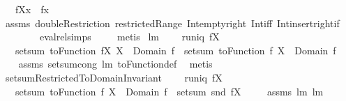 \begin{isabellebody}
\ \ \ {\isachardoublequoteopen}{\isacharparenleft}f{\isacharbar}{\isacharbar}X{\isacharparenright}{\isacharcomma}{\isacharcomma}x\ {\isacharequal}\ f{\isacharcomma}{\isacharcomma}x{\isachardoublequoteclose}\ \isanewline
%
\isadelimproof
\ \ %
\endisadelimproof
%
\isatagproof
{}\isamarkupfalse%
\ assms\ doubleRestriction\ restrictedRange\ Int{\isacharunderscore}empty{\isacharunderscore}right\ Int{\isacharunderscore}iff\ Int{\isacharunderscore}insert{\isacharunderscore}right{\isacharunderscore}if{}\isanewline
\ \ \ \ \ \ \ \ eval{\isacharunderscore}rel{\isachardot}simps\ \isanewline
\ \ \isamarkupfalse%
\ metis%
\endisatagproof
{\isafoldproof}%
%
\isadelimproof
\isanewline
%
\endisadelimproof
\isanewline
{}\isamarkupfalse%
\ lm{}{}{}{\isacharcolon}\ \isanewline
\ \ \ {\isachardoublequoteopen}runiq\ {\isacharparenleft}f{\isacharbar}{\isacharbar}X{\isacharparenright}{\isachardoublequoteclose}\ \isanewline
\ \ \ {\isachardoublequoteopen}setsum\ {\isacharparenleft}toFunction\ {\isacharparenleft}f{\isacharbar}{\isacharbar}X{\isacharparenright}{\isacharparenright}\ {\isacharparenleft}X\ {\isasyminter}\ Domain\ f{\isacharparenright}\ {\isacharequal}\ setsum\ {\isacharparenleft}toFunction\ f{\isacharparenright}\ {\isacharparenleft}X\ {\isasyminter}\ Domain\ f{\isacharparenright}{\isachardoublequoteclose}\ \isanewline
%
\isadelimproof
\ \ %
\endisadelimproof
%
\isatagproof
{}\isamarkupfalse%
\ assms\ setsum{\isachardot}cong\ lm{}{}{}\ toFunction{\isacharunderscore}def\ \isamarkupfalse%
\ metis%
\endisatagproof
{\isafoldproof}%
%
\isadelimproof
\isanewline
%
\endisadelimproof
\isanewline
{}\isamarkupfalse%
\ setsumRestrictedToDomainInvariant{\isacharcolon}\ \isanewline
\ \ \ {\isachardoublequoteopen}runiq\ {\isacharparenleft}f{\isacharbar}{\isacharbar}X{\isacharparenright}{\isachardoublequoteclose}\ \isanewline
\ \ \ {\isachardoublequoteopen}setsum\ {\isacharparenleft}toFunction\ f{\isacharparenright}\ {\isacharparenleft}X\ {\isasyminter}\ Domain\ f{\isacharparenright}\ {\isacharequal}\ setsum\ snd\ {\isacharparenleft}f{\isacharbar}{\isacharbar}X{\isacharparenright}{\isachardoublequoteclose}\ \isanewline
%
\isadelimproof
\ \ %
\endisadelimproof
%
\isatagproof
{}\isamarkupfalse%
\ assms\ lm{}{}{}\ lm{}{}{}\ \isamarkupfalse%

\end{isabellebody}
